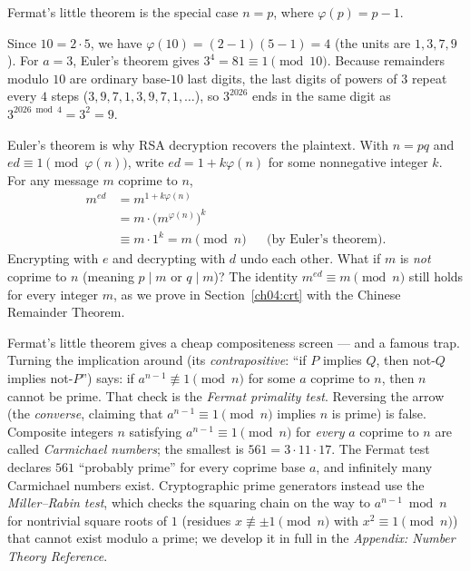 Fermat's little theorem is the special case $n = p$, where $\varphi(p) = p - 1$.

\begin{example}[Euler at $n = 10$]
\label{ch04:ex-euler-10}
Since $10 = 2 \cdot 5$, we have $\varphi(10) = (2-1)(5-1) = 4$ (the units are $1, 3, 7, 9$). For
$a = 3$, Euler's theorem gives $3^4 = 81 \equiv 1 \pmod{10}$. Because remainders modulo $10$ are
ordinary base-$10$ last digits, the last digits of powers of $3$ repeat every $4$ steps
($3, 9, 7, 1, 3, 9, 7, 1, \dots$), so $3^{2026}$ ends in the same digit as
$3^{2026 \bmod 4} = 3^2 = 9$.
\end{example}

\begin{whybox}
Euler's theorem is why RSA decryption recovers the plaintext. With $n = pq$ and
$ed \equiv 1 \pmod{\varphi(n)}$, write $ed = 1 + k\varphi(n)$ for some nonnegative integer $k$. For
any message $m$ coprime to $n$,
\begin{align*}
  m^{ed} &= m^{1 + k\varphi(n)} \\
         &= m \cdot \bigl(m^{\varphi(n)}\bigr)^k \\
         &\equiv m \cdot 1^k = m \pmod n && \text{(by Euler's theorem)}.
\end{align*}
Encrypting with $e$ and decrypting with $d$ undo each other. What if $m$ is \emph{not} coprime to
$n$ (meaning $p \mid m$ or $q \mid m$)? The identity $m^{ed} \equiv m \pmod n$ still holds for
every integer $m$, as we prove in Section~\ref{ch04:crt} with the Chinese Remainder Theorem.
\end{whybox}

\begin{attackbox}
Fermat's little theorem gives a cheap compositeness screen --- and a famous trap. Turning the
implication around (its \emph{contrapositive}: ``if $P$ implies $Q$, then not-$Q$ implies not-$P$'')
says: if $a^{n-1} \not\equiv 1 \pmod n$ for some $a$ coprime to $n$, then $n$ cannot be prime. That
check is the \emph{Fermat primality test}. Reversing the arrow (the \emph{converse}, claiming that
$a^{n-1} \equiv 1 \pmod n$ implies $n$ is prime) is false. Composite integers $n$ satisfying
$a^{n-1} \equiv 1 \pmod n$ for \emph{every} $a$ coprime to $n$ are called \emph{Carmichael numbers};
the smallest is $561 = 3 \cdot 11 \cdot 17$. The Fermat test declares $561$ ``probably prime'' for
every coprime base $a$, and infinitely many Carmichael numbers exist. Cryptographic prime generators
instead use the \emph{Miller--Rabin test}, which checks the squaring chain on the way to
$a^{n-1} \bmod n$ for nontrivial square roots of $1$ (residues $x \not\equiv \pm 1 \pmod n$ with
$x^2 \equiv 1 \pmod n$) that cannot exist modulo a prime; we develop it in full in the
\emph{Appendix: Number Theory Reference}.
\end{attackbox}

